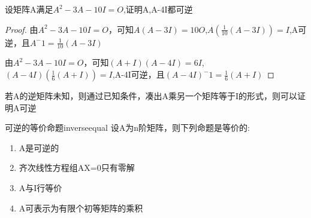 \begin{example}
	设矩阵A满足$A^2-3A-10I=O$,证明A,A-4I都可逆

	\begin{proof}
		\par
		由$A^2-3A-10I=O$，可知$A(A-3I)=10O$,$A(\frac{1}{10}(A-3I))=I$,A可逆，且$A^-1=\frac{1}{10}(A-3I)$

		由$A^2-3A-10I=O$，可知$(A+I)(A-4I)=6I$,$(A-4I)(\frac{1}{6}(A+I))=I$,A-4I可逆，且$(A-4I)^-1=\frac{1}{6}(A+I)$

	\end{proof}

	\begin{note}
		若A的逆矩阵未知，则通过已知条件，凑出A乘另一个矩阵等于I的形式，则可以证明A可逆
	\end{note}
\end{example}

\begin{theorem}{可逆的等价命题}{inverseequal}
	设A为n阶矩阵，则下列命题是等价的:
	\begin{enumerate}
		\item  A是可逆的
		\item 齐次线性方程组AX=0只有零解
		\item A与I行等价
		\item A可表示为有限个初等矩阵的乘积
	\end{enumerate}
\end{theorem}

